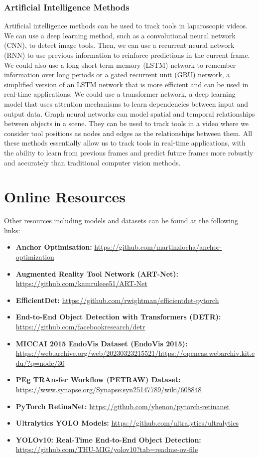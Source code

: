 \subsubsection{Artificial Intelligence Methods}

Artificial intelligence methods can be used to track tools in laparoscopic videos. We can use a deep learning method, such as a convolutional neural network (CNN), to detect image tools. Then, we can use a recurrent neural network (RNN) to use previous information to reinforce predictions in the current frame. We could also use a long short-term memory (LSTM) network to remember information over long periods or a gated recurrent unit (GRU) network, a simplified version of an LSTM network that is more efficient and can be used in real-time applications. We could use a transformer network, a deep learning model that uses attention mechanisms to learn dependencies between input and output data.  Graph neural networks can model spatial and temporal relationships between objects in a scene. They can be used to track tools in a video where we consider tool positions as nodes and edges as the relationships between them. All these methods essentially allow us to track tools in real-time applications, with the ability to learn from previous frames and predict future frames more robustly and accurately than traditional computer vision methods.

\section{Online Resources}

Other resources including models and datasets can be found at the following links:

\begin{itemize}[noitemsep, left=0pt]
\item \textbf{Anchor Optimisation:} \url{https://github.com/martinzlocha/anchor-optimization}
\item \textbf{Augmented Reality Tool Network (ART-Net):} \url{https://github.com/kamruleee51/ART-Net}
\item \textbf{EfficientDet:} \url{https://github.com/rwightman/efficientdet-pytorch}
\item \textbf{End-to-End Object Detection with Transformers (DETR):} \url{https://github.com/facebookresearch/detr}
\item \textbf{MICCAI 2015 EndoVis Dataset (EndoVis 2015):} \url{https://web.archive.org/web/20230323215521/https://opencas.webarchiv.kit.edu/?q=node/30}
\item \textbf{PEg TRAnsfer Workflow (PETRAW) Dataset:} \url{https://www.synapse.org/Synapse:syn25147789/wiki/608848}
\item \textbf{PyTorch RetinaNet:} \url{https://github.com/yhenon/pytorch-retinanet}
\item \textbf{Ultralytics YOLO Models:} \url{https://github.com/ultralytics/ultralytics}
\item \textbf{YOLOv10: Real-Time End-to-End Object Detection:} \url{https://github.com/THU-MIG/yolov10?tab=readme-ov-file}
\end{itemize}